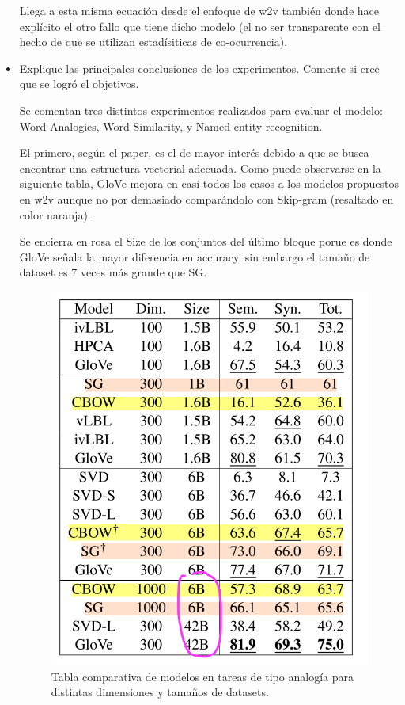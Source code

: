\documentclass[letter, 11pt, twoside]{report}
\begin{document}
\begin{itemize}
    Llega a esta misma ecuación desde el enfoque de w2v también donde hace explícito el otro fallo que tiene dicho modelo (el no ser transparente con el hecho de que se utilizan estadísiticas de co-ocurrencia).
    
  \item Explique las principales conclusiones de los experimentos. Comente si cree que se logró el objetivos.
  
  Se comentan tres distintos experimentos realizados para evaluar el modelo: Word Analogies, Word Similarity, y Named entity recognition.
  
  El primero, según el paper, es el de mayor interés debido a que se busca encontrar una estructura vectorial adecuada. 
  Como puede observarse en la siguiente tabla, GloVe mejora en casi todos los casos a los modelos propuestos en w2v aunque no por demasiado comparándolo con Skip-gram (resaltado en color naranja). 


  Se encierra en rosa el Size de los conjuntos del último bloque porue es donde GloVe señala la mayor diferencia en accuracy, sin embargo el tamaño de dataset es 7 veces más grande que SG.


  \begin{figure}[H]
    \begin{center}
      \includegraphics[scale=0.25]{analogy.jpg}
      \caption{Tabla comparativa de modelos en tareas de tipo analogía para distintas dimensiones y tamaños de datasets.}
      \label{an}
    \end{center}
  \end{figure}




\end{itemize}
\end{document}
